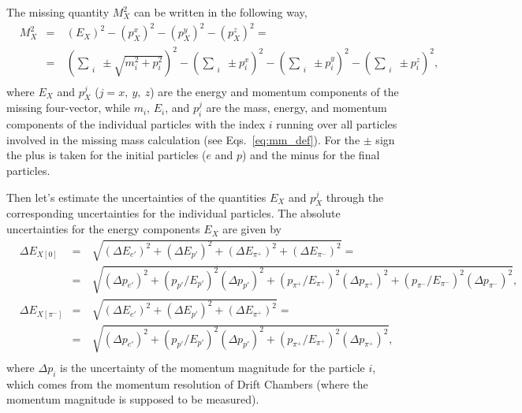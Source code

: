 The missing quantity $M_{X}^{2}$ can be written in the following way,\vspace{-0.5em}
\begin{equation}
\begin{aligned}
&M_{X}^{2}&=&~(E_{X})^{2} - (p_{X}^{x})^{2} - (p_{X}^{y})^{2}  -  (p_{X}^{z})^{2} =\\
&&=&~\left (\sum_{\substack{i}} \pm \sqrt{m_{i}^{2}+p_{i}^{2}} \right )^{2} - \left (\sum_{\substack{i}}\pm p_{i}^{x} \right )^{2} - \left (\sum_{\substack{i}}\pm p_{i}^{y} \right )^{2} - \left (\sum_{\substack{i}}\pm p_{i}^{z} \right )^{2},\\[-7pt]
\end{aligned}\label{eq:mm_def2}
\end{equation}
where $E_{X}$ and $p_{X}^{j}$ ($j = x,~y,~z$) are the energy and momentum components of the missing four-vector, while $m_{i}$, $E_{i}$, and $p_{i}^{j}$ are the mass, energy, and momentum components of the individual particles with the index $i$ running over all particles involved in the missing mass calculation (see Eqs.~\eqref{eq:mm_def}). For the $\pm$ sign the plus is taken for the initial particles ($e$ and $p$) and the minus for the final particles.




Then let's estimate the uncertainties of the quantities $E_{X}$ and $p_{X}^{j}$ through the corresponding uncertainties for the individual particles. 
The absolute uncertainties for the energy components $E_{X}$ are given by\vspace{-0.5em}
\begin{equation}
\begin{aligned}
&\Delta E_{X[0]} &=&~\sqrt{ \left ( \Delta E_{e'} \right )^{2} + \left ( \Delta E_{p'} \right )^{2} +  \left ( \Delta E_{\pi^{+}} \right )^{2} + \left ( \Delta E_{\pi^{-}} \right )^{2}} =\\
&&=&~\sqrt{\left ( \Delta p_{e'} \right )^{2} + \left (p_{p'}/E_{p'}\right )^{2} \left (\Delta p_{p'} \right )^{2} +  \left (p_{\pi^{+}}/E_{\pi^{+}}\right )^{2} \left (\Delta p_{\pi^{+}} \right )^{2}+\left (p_{\pi^{-}}/E_{\pi^{-}}\right )^{2} \left (\Delta p_{\pi^{-}} \right )^{2}}, \\[10pt]
&\Delta E_{X[\pi^{-}]} &=&~\sqrt{ \left ( \Delta E_{e'} \right )^{2} + \left ( \Delta E_{p'} \right )^{2} + \left ( \Delta E_{\pi^{+}} \right )^{2}}=\\
&&=&~\sqrt{\left ( \Delta p_{e'} \right )^{2} + \left (p_{p'}/E_{p'}\right )^{2} \left (\Delta p_{p'} \right )^{2} +  \left (p_{\pi^{+}}/E_{\pi^{+}}\right )^{2} \left (\Delta p_{\pi^{+}} \right )^{2}},\\[-7pt]
\end{aligned}\label{eq:res}
\end{equation}
where $\Delta p_{i}$ is the uncertainty of the momentum magnitude for the particle $i$, which comes from the momentum resolution of Drift Chambers (where the momentum magnitude is supposed to be measured).

